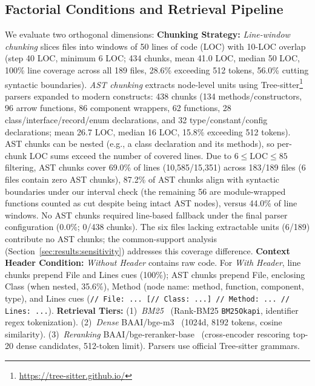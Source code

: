 \subsection{Factorial Conditions and Retrieval Pipeline}
\label{sec:approach:factorial}
We evaluate two orthogonal dimensions:
\textbf{Chunking Strategy:} \textit{Line-window chunking} slices files into windows of 50 lines of code (LOC) with 10-LOC overlap (step 40 LOC, minimum 6 LOC; 434 chunks, mean 41.0 LOC, median 50 LOC, 100\% line coverage across all 189 files, 28.6\% exceeding 512 tokens, 56.0\% cutting syntactic boundaries). 
\textit{AST chunking} extracts node-level units using Tree-sitter\footnote{\url{https://tree-sitter.github.io/}} parsers expanded to modern constructs: 438 chunks (134 methods/constructors, 96 arrow functions, 86 component wrappers, 62 functions, 28 class/interface/record/enum declarations, and 32 type/constant/config declarations; mean 26.7 LOC, median 16 LOC, 15.8\% exceeding 512 tokens). AST chunks can be nested (e.g., a class declaration and its methods), so per-chunk LOC sums exceed the number of covered lines. 
Due to $6 \le \text{LOC} \le 85$ filtering, AST chunks cover 69.0\% of lines (10,585/15,351) across 183/189 files (6 files contain zero AST chunks), 87.2\% of AST chunks align with syntactic boundaries under our interval check (the remaining 56 are module-wrapped functions counted as cut despite being intact AST nodes), versus 44.0\% of line windows. 
No AST chunks required line-based fallback under the final parser configuration (0.0\%; 0/438 chunks). The six files lacking extractable units (6/189) contribute no AST chunks; the common-support analysis (Section~\ref{sec:results:sensitivity}) addresses this coverage difference.
\textbf{Context Header Condition:} \textit{Without Header} contains raw code. For \textit{With Header}, line chunks prepend File and Lines cues (100\%); AST chunks prepend File, enclosing Class (when nested, 35.6\%), Method (node name: method, function, component, type), and Lines cues (\texttt{// File: ... [// Class: ...] // Method: ... // Lines: ...}).
\textbf{Retrieval Tiers:} (1)~\textit{BM25}~\cite{robertson2009bm25} (Rank-BM25 \texttt{BM25Okapi}, identifier regex tokenization). (2)~\textit{Dense} BAAI/bge-m3~\cite{chen2024bgem3} (1024d, 8192 tokens, cosine similarity). (3)~\textit{Reranking} BAAI/bge-reranker-base~\cite{xiao2024cpack} (cross-encoder rescoring top-20 dense candidates, 512-token limit). Parsers use official Tree-sitter grammars.

